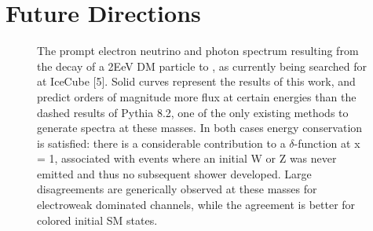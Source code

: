 \section{Future Directions \label{sec:future}}

\begin{figure}[h]
    \caption{The prompt electron neutrino and photon spectrum resulting from the decay of a 2EeV DM particle to , as currently being searched for at IceCube [5]. Solid curves represent the results of this work, and predict orders of magnitude more flux at certain energies than the dashed results of Pythia 8.2, one of the only existing methods to generate spectra at these masses. In both cases energy conservation is satisfied: there is a considerable contribution to a $\delta$-function at x = 1, associated with events where an initial W or Z was never emitted and thus no subsequent shower developed. Large disagreements are generically observed at these masses for electroweak dominated channels, while the agreement is better for colored initial SM states.}
    \label{fig:nu_and_gam}
\end{figure}


